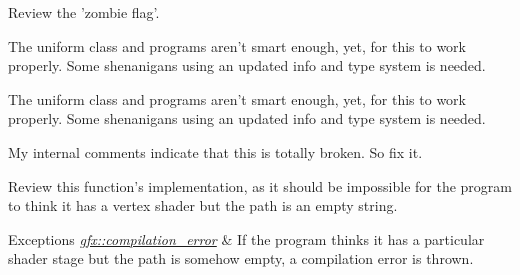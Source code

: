 \begin{DoxyRefList}
\item[\label{todo__todo000002}%
\hypertarget{todo__todo000002}{}%
Member \hyperlink{classgfx_1_1context_a02588dfb533acd93bab925211bb48273}{gfx\-:\-:context\-:\-:$\sim$context} ()]Review the 'zombie flag'.  
\item[\label{todo__todo000019}%
\hypertarget{todo__todo000019}{}%
Member \hyperlink{classgfx_1_1light_a7b974f1340562d8740192b2ff0d62f93}{gfx\-:\-:light\-:\-:upload\-\_\-uniform} (program \&prgm, std\-::string const \&name)]The uniform class and programs aren't smart enough, yet, for this to work properly. Some shenanigans using an updated info and type system is needed.  
\item[\label{todo__todo000020}%
\hypertarget{todo__todo000020}{}%
Member \hyperlink{classgfx_1_1point__light_a9549403e263927018c000f857cb1e718}{gfx\-:\-:point\-\_\-light\-:\-:upload\-\_\-uniform} (program \&prgm, std\-::string const \&name)]The uniform class and programs aren't smart enough, yet, for this to work properly. Some shenanigans using an updated info and type system is needed.  
\item[\label{todo__todo000016}%
\hypertarget{todo__todo000016}{}%
Member \hyperlink{classgfx_1_1process__cam_abf4a9226e8d0907b70f3eadc2b4229a5}{gfx\-:\-:process\-\_\-cam\-:\-:update\-\_\-view} ()]My internal comments indicate that this is totally broken. So fix it.  
\item[\label{todo__todo000026}%
\hypertarget{todo__todo000026}{}%
Member \hyperlink{classgfx_1_1program_ab925e8e749e08329b745635c388c3428}{gfx\-:\-:program\-:\-:compile} ()]Review this function's implementation, as it should be impossible for the program to think it has a vertex shader but the path is an empty string. 
\begin{DoxyExceptions}{Exceptions}
{\em \hyperlink{classgfx_1_1compilation__error}{gfx\-::compilation\-\_\-error}} & If the program thinks it has a particular shader stage but the path is somehow empty, a compilation error is thrown.  \\
\hline
\end{DoxyExceptions}


\end{DoxyRefList}
